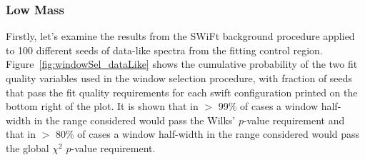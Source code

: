 \subsubsection{Low Mass}
\label{sec:lowmass_windowSelTests} 

Firstly, let's examine the results from the SWiFt background procedure applied to 100 different seeds of data-like spectra from the fitting control region.
Figure~\ref{fig:windowSel_dataLike} shows the cumulative probability of the two fit quality variables used in the window selection procedure,
with fraction of seeds that pass the fit quality requirements for each swift configuration printed on the bottom right of the plot.
It is shown that in $>$ 99\% of cases a window half-width in the range considered would pass the Wilks' \mbox{$p$-value} requirement
and that in $>$ 80\% of cases a window half-width in the range considered would pass the global $\chi^{2}$ \mbox{$p$-value} requirement.

